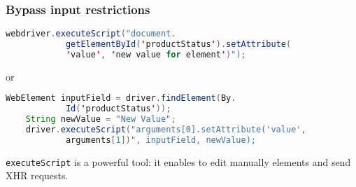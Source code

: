 \documentclass[a4paper, 10pt, titlepage]{article}
\begin{document}
\subsubsection*{Bypass input restrictions}
\begin{lstlisting}[language=java]
	webdriver.executeScript("document.
			getElementById('productStatus').setAttribute(
			'value', 'new value for element')");
\end{lstlisting}
or 
\begin{lstlisting}[language=java]
	WebElement inputField = driver.findElement(By.
			Id('productStatus'));
	String newValue = "New Value";
	driver.executeScript("arguments[0].setAttribute('value',
			arguments[1])", inputField, newValue);
\end{lstlisting}
\lstinline|executeScript| is a powerful tool: it enables to edit manually elements and send XHR requests.
\end{document}
